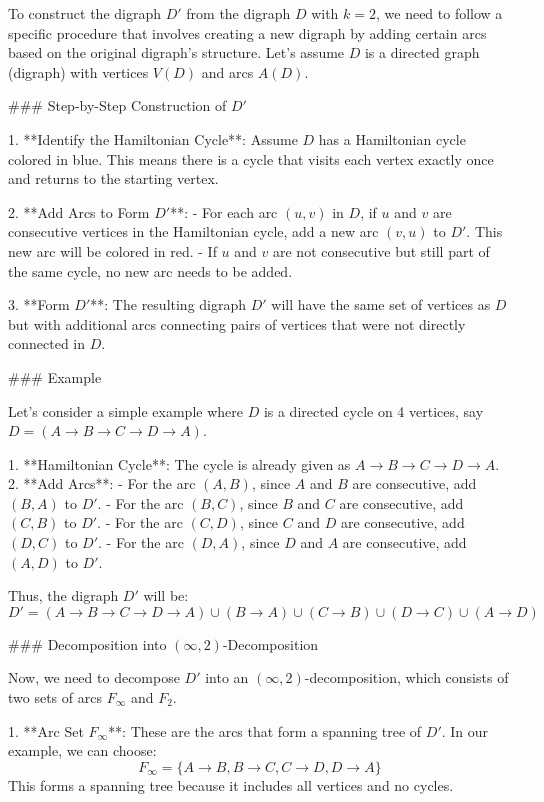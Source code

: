 To construct the digraph \( D' \) from the digraph \( D \) with \( k = 2 \), we need to follow a specific procedure that involves creating a new digraph by adding certain arcs based on the original digraph's structure. Let's assume \( D \) is a directed graph (digraph) with vertices \( V(D) \) and arcs \( A(D) \).

### Step-by-Step Construction of \( D' \)

1. **Identify the Hamiltonian Cycle**: Assume \( D \) has a Hamiltonian cycle colored in blue. This means there is a cycle that visits each vertex exactly once and returns to the starting vertex.

2. **Add Arcs to Form \( D' \)**:
   - For each arc \( (u, v) \) in \( D \), if \( u \) and \( v \) are consecutive vertices in the Hamiltonian cycle, add a new arc \( (v, u) \) to \( D' \). This new arc will be colored in red.
   - If \( u \) and \( v \) are not consecutive but still part of the same cycle, no new arc needs to be added.

3. **Form \( D' \)**: The resulting digraph \( D' \) will have the same set of vertices as \( D \) but with additional arcs connecting pairs of vertices that were not directly connected in \( D \).

### Example

Let's consider a simple example where \( D \) is a directed cycle on 4 vertices, say \( D = (A \to B \to C \to D \to A) \).

1. **Hamiltonian Cycle**: The cycle is already given as \( A \to B \to C \to D \to A \).
2. **Add Arcs**:
   - For the arc \( (A, B) \), since \( A \) and \( B \) are consecutive, add \( (B, A) \) to \( D' \).
   - For the arc \( (B, C) \), since \( B \) and \( C \) are consecutive, add \( (C, B) \) to \( D' \).
   - For the arc \( (C, D) \), since \( C \) and \( D \) are consecutive, add \( (D, C) \) to \( D' \).
   - For the arc \( (D, A) \), since \( D \) and \( A \) are consecutive, add \( (A, D) \) to \( D' \).

Thus, the digraph \( D' \) will be:
\[ D' = (A \to B \to C \to D \to A) \cup (B \to A) \cup (C \to B) \cup (D \to C) \cup (A \to D) \]

### Decomposition into \( (\infty, 2) \)-Decomposition

Now, we need to decompose \( D' \) into an \( (\infty, 2) \)-decomposition, which consists of two sets of arcs \( F_\infty \) and \( F_2 \).

1. **Arc Set \( F_\infty \)**: These are the arcs that form a spanning tree of \( D' \). In our example, we can choose:
   \[ F_\infty = \{ A \to B, B \to C, C \to D, D \to A \} \]
   This forms a spanning tree because it includes all vertices and no cycles.


